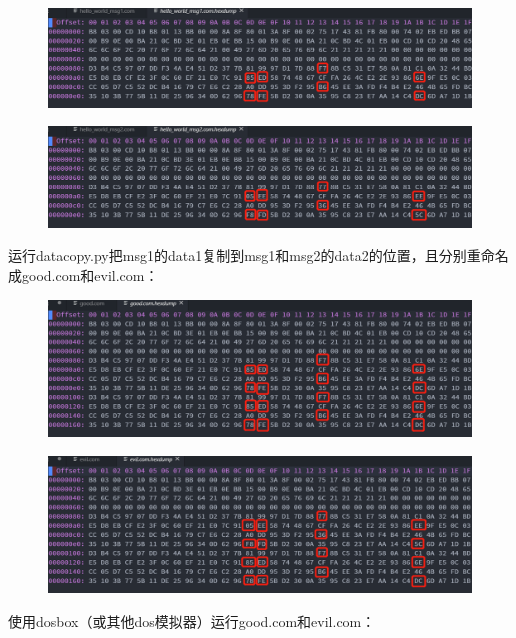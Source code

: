 \documentclass[UTF8, a4paper, 11pt]{article}
\begin{document}
\begin{figure}[H]
    \centering
    \includegraphics[width = \textwidth]{msg1.png}
\end{figure}
\begin{figure}[H]
    \centering
    \includegraphics[width = \textwidth]{msg2.png}
\end{figure}
运行datacopy.py把msg1的data1复制到msg1和msg2的data2的位置，且分别重命名成good.com和evil.com：
\begin{figure}[H]
    \centering
    \includegraphics[width = \textwidth]{good_hex.png}
\end{figure}
\begin{figure}[H]
    \centering
    \includegraphics[width = \textwidth]{evil_hex.png}
\end{figure}
使用dosbox（或其他dos模拟器）运行good.com和evil.com：
\end{document}
